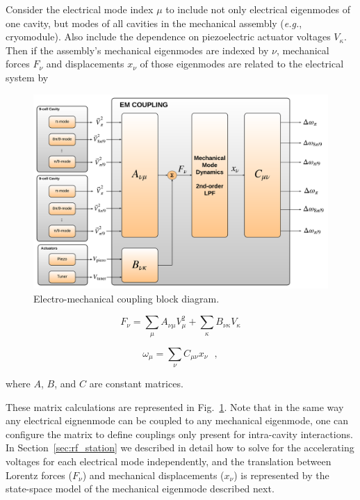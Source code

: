 \documentclass[a4paper,12pt]{article}
\begin{document}
Consider the electrical mode index $\mu$ to include not only electrical eigenmodes of one cavity, but modes of all cavities in the mechanical assembly ({\it e.g.}, cryomodule). Also include the dependence on piezoelectric actuator voltages $V_\kappa$. Then if the assembly's mechanical eigenmodes are indexed by $\nu$, mechanical forces $F_\nu$ and displacements $x_\nu$ of those eigenmodes are related to the electrical system by

\begin{figure}
\centering
\includegraphics[scale=0.25]{../figures/EM_Coupling_blocks.png}
\caption{Electro-mechanical coupling block diagram.}
\label{fig:EM_couplings}
\end{figure}

\begin{equation}
F_\nu = \sum_\mu A_{\nu\mu} V_\mu^2 + \sum_\kappa B_{\nu\kappa}V_\kappa
\label{eq:F_nu}
\end{equation}

\begin{equation}
\omega_\mu = \sum_\nu C_{\mu\nu} x_\nu~~~,
\label{eq:omega_mu}
\end{equation}

\noindent where $A$, $B$, and $C$ are constant matrices.

These matrix calculations are represented in Fig.~\ref{fig:EM_couplings}. Note that in the same way any electrical eignenmode can be coupled to any mechanical eigenmode, one can configure the matrix to define couplings only present for intra-cavity interactions. In Section~\ref{sec:rf_station} we described in detail how to solve for the accelerating voltages for each electrical mode independently, and the translation between Lorentz forces ($F_\nu$) and mechanical displacements ($x_\nu$) is represented by the state-space model of the mechanical eigenmode described next.
\end{document}

